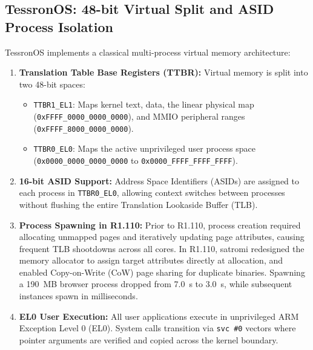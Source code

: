 \documentclass[10pt,journal,compsoc,twocolumn]{article}
\begin{document}
\subsection{TessronOS: 48-bit Virtual Split and ASID Process Isolation}
TessronOS implements a classical multi-process virtual memory architecture:
\begin{enumerate}[leftmargin=*]
    \item \textbf{Translation Table Base Registers (TTBR):} Virtual memory is split into two 48-bit spaces:
    \begin{itemize}
        \item \texttt{TTBR1\_EL1}: Maps kernel text, data, the linear physical map (\texttt{0xFFFF\_0000\_0000\_0000}), and MMIO peripheral ranges (\texttt{0xFFFF\_8000\_0000\_0000}).
        \item \texttt{TTBR0\_EL0}: Maps the active unprivileged user process space (\texttt{0x0000\_0000\_0000\_0000} to \texttt{0x0000\_FFFF\_FFFF\_FFFF}).
    \end{itemize}
    \item \textbf{16-bit ASID Support:} Address Space Identifiers (ASIDs) are assigned to each process in \texttt{TTBR0\_EL0}, allowing context switches between processes without flushing the entire Translation Lookaside Buffer (TLB).
    \item \textbf{Process Spawning in R1.110:} Prior to R1.110, process creation required allocating unmapped pages and iteratively updating page attributes, causing frequent TLB shootdowns across all cores. In R1.110, satromi redesigned the memory allocator to assign target attributes directly at allocation, and enabled Copy-on-Write (CoW) page sharing for duplicate binaries. Spawning a 190~MB browser process dropped from 7.0~s to 3.0~s, while subsequent instances spawn in milliseconds.
    \item \textbf{EL0 User Execution:} All user applications execute in unprivileged ARM Exception Level 0 (EL0). System calls transition via \texttt{svc \#0} vectors where pointer arguments are verified and copied across the kernel boundary.
\end{enumerate}
\end{document}
